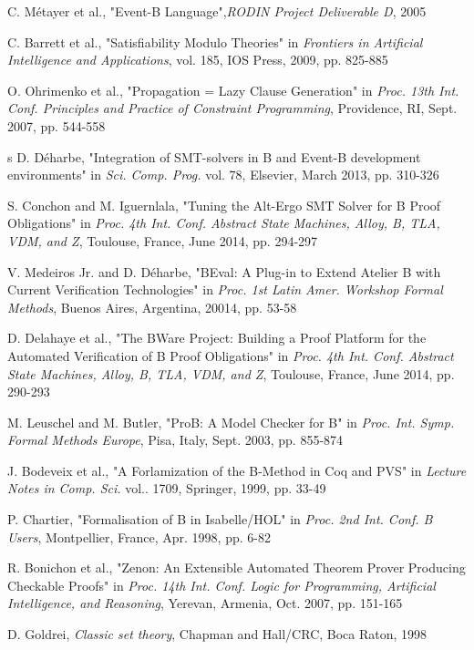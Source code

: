\documentclass[12pt,journal,duplex]{IEEEtran}
\begin{document}
\begin{thebibliography}{2}
		C. M\'{e}tayer et al., "Event-B Language",\emph{RODIN Project Deliverable D}, 2005

		C. Barrett et al., "Satisfiability Modulo Theories" in \emph{Frontiers in Artificial Intelligence and Applications}, vol. 185, IOS Press, 2009, pp. 825-885
		
		O. Ohrimenko et al., "Propagation = Lazy Clause Generation" in \emph{Proc. 13th Int. Conf. Principles and Practice of Constraint Programming}, Providence, RI, Sept. 2007, pp. 544-558
		
s		
		D. D\'{e}harbe, "Integration of SMT-solvers in B and Event-B development environments" in \emph{Sci. Comp. Prog.} vol. 78, Elsevier, March 2013, pp. 310-326

		S. Conchon and M. Iguernlala, "Tuning the Alt-Ergo SMT Solver for B Proof Obligations" in \emph{Proc. 4th Int. Conf. Abstract State Machines, Alloy, B, TLA, VDM, and Z}, Toulouse, France, June 2014, pp. 294-297

		V. Medeiros Jr. and D. D\'{e}harbe, "BEval: A Plug-in to Extend Atelier B with Current Verification Technologies" in \emph{Proc. 1st Latin Amer. Workshop Formal Methods}, Buenos Aires, Argentina, 20014, pp. 53-58

		D. Delahaye et al., "The BWare Project: Building a Proof Platform for the Automated Verification of B Proof Obligations" in \emph{Proc. 4th Int. Conf. Abstract State Machines, Alloy, B, TLA, VDM, and Z}, Toulouse, France, June 2014, pp. 290-293

		M. Leuschel and M. Butler, "ProB: A Model Checker for B" in \emph{Proc. Int. Symp. Formal Methods Europe}, Pisa, Italy, Sept. 2003, pp. 855-874
		
		J. Bodeveix et al., "A Forlamization of the B-Method in Coq and PVS" in \emph{Lecture Notes in Comp. Sci.} vol.. 1709, Springer, 1999, pp. 33-49
		
		P. Chartier, "Formalisation of B in Isabelle/HOL" in \emph{Proc. 2nd Int. Conf. B Users}, Montpellier, France, Apr. 1998, pp. 6-82
		
		R. Bonichon et al., "Zenon: An Extensible Automated Theorem Prover Producing Checkable Proofs" in \emph{Proc. 14th Int. Conf. Logic for Programming, Artificial Intelligence, and Reasoning}, Yerevan, Armenia, Oct. 2007, pp. 151-165

		D. Goldrei, \emph{Classic set theory}, Chapman and Hall/CRC, Boca Raton, 1998


	\end{thebibliography}
\end{document}
